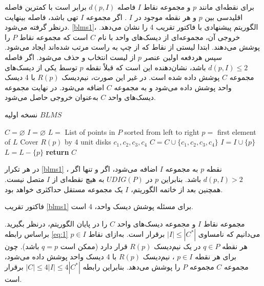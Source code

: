 \documentclass[12pt]{article}
\begin{document}
برای نقطه‌ای مانند $p$ و مجموعه نقاط $I$ فاصله $d(p,I)$ برابر است با کمترین فاصله اقلیدسی بین $p$ و هر نقطه موجود در $I$ . اگر مجموعه $I$ تهی باشد، فاصله بینهایت درنظر گرفته می‌شود. \cref{blms1}، الگوریتم پیشنهادی با فاکتور تقریب 4 را نشان می‌دهد. خروجی آن، مجموعه‌ای از دیسک‌های واحد با نام $C$ است که مجموعه نقاط $P$ را پوشش می‌دهند. ابتدا لیستی از نقاط که از چپ به راست مرتب شده‌اند ایجاد می‌شود. سپس هردفعه اولین عنصر $p$ از لیست انتخاب و حذف می‌شود. اگر فاصله
$d(p,I) \leqslant 2$
باشد، نشان‌دهنده این است که قبلاً نقطه $p$ توسط یکی از دیسک‌های مجموعه $C$ پوشش داده شده است. در غیر این صورت، نیم‌دیسک $R(p)$ با 4 دیسک واحد پوشش داده می‌شود و به مجموعه $C$ اضافه می‌شود. در نهایت مجموعه دیسک‌های واحد $C$ به‌عنوان خروجی حاصل می‌شود.

\begin{algorithm}[!h]
\caption{
نسخه اولیه $BLMS$
}
\label{blms1}
\begin{latin}
\begin{algorithmic}[1]
\STATE $C = \varnothing$
\STATE $I = \varnothing$
\STATE $L =$ List of points in $P$ sorted from left to right
    \STATE $p =$ first element of $L$
        \STATE Cover $R(p)$ by 4 unit disks $c_{1}, c_{2}, c_{3}, c_{4}$
        \STATE $C = C \cup \{ c_{1}, c_{2}, c_{3}, c_{4} \}$
        \STATE $I = I \cup \{ p \}$
    \ENDIF
    \STATE $L = L - \{ p \}$
\ENDWHILE
\STATE \textbf{return} $C$
\end{algorithmic}
\end{latin}
\end{algorithm}

در هر تکرار \cref{blms1} ، نقطه $p$ به مجموعه $I$ اضافه می‌شود، اگر و تنها اگر $d(p,I) > 2$ باشد. بنابراین $p$ در $UDIG(P)$ به هیچ نقطه‌ای از $I$ متصل نیست. همچنین بعد از خاتمه الگوریتم، $I$ یک مجموعه مستقل حداکثری خواهد بود.

\begin{theorem}
فاکتور تقریب \cref{blms1} برای مسئله پوشش دیسک واحد، 4 است.
\end{theorem}

\begin{cproof}
مجموعه نقاط $I$ و مجموعه دیسک‌های واحد $C$ را در پایان الگوریتم، درنظر بگیرید. براساس رابطه \ref{eq:1} می‌دانیم که نامساوی $|I| \leqslant |C^{*}|$ برقرار است. به‌ازای نقاط $p \in I$ هر نقطه $q \in P$ در یک نیم‌دیسک $R(p)$ قرار دارد (ممکن است $q = p$ باشد). چون برای هر نقطه $p \in I$ ، نیم‌دیسک $R(p)$ با 4 دیسک واحد پوشش داده می‌شود، مجموعه $C$ مجموعه $P$ را پوشش می‌دهد. بنابراین رابطه
$|C| \leqslant 4|I| \leqslant 4|C^{*}|$
برقرار است.
\end{cproof}
\end{document}
